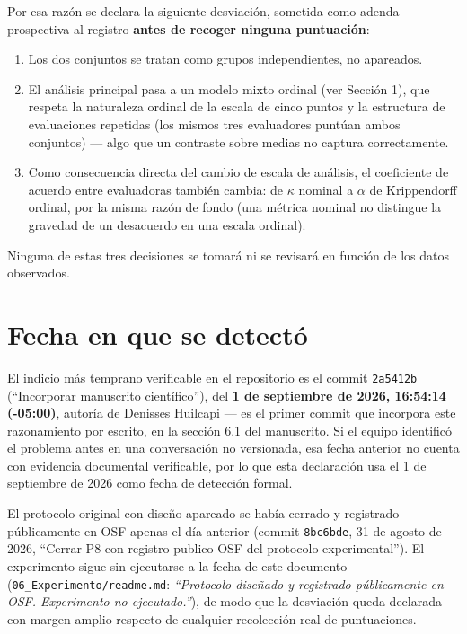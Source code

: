 \documentclass[11pt,a4paper]{article}
\newcommand{\id}[1]{\texttt{#1}}
\begin{document}
Por esa razón se declara la siguiente desviación, sometida como adenda
prospectiva al registro \textbf{antes de recoger ninguna puntuación}:

\begin{enumerate}[label=\arabic*.]
  \item Los dos conjuntos se tratan como grupos independientes, no apareados.
  \item El análisis principal pasa a un modelo mixto ordinal (ver Sección 1),
        que respeta la naturaleza ordinal de la escala de cinco puntos y la
        estructura de evaluaciones repetidas (los mismos tres evaluadores
        puntúan ambos conjuntos) --- algo que un contraste sobre medias no
        captura correctamente.
  \item Como consecuencia directa del cambio de escala de análisis, el
        coeficiente de acuerdo entre evaluadoras también cambia: de
        $\kappa$ nominal a $\alpha$ de Krippendorff ordinal, por la misma
        razón de fondo (una métrica nominal no distingue la gravedad de un
        desacuerdo en una escala ordinal).
\end{enumerate}

Ninguna de estas tres decisiones se tomará ni se revisará en función de los
datos observados.

\section{Fecha en que se detectó}

El indicio más temprano verificable en el repositorio es el commit
\id{2a5412b} (``Incorporar manuscrito científico''), del \textbf{1 de
septiembre de 2026, 16:54:14 (-05:00)}, autoría de Denisses Huilcapi --- es
el primer commit que incorpora este razonamiento por escrito, en la sección
6.1 del manuscrito. Si el equipo identificó el problema antes en una
conversación no versionada, esa fecha anterior no cuenta con evidencia
documental verificable, por lo que esta declaración usa el 1 de septiembre
de 2026 como fecha de detección formal.

El protocolo original con diseño apareado se había cerrado y registrado
públicamente en OSF apenas el día anterior (commit \id{8bc6bde}, 31 de
agosto de 2026, ``Cerrar P8 con registro publico OSF del protocolo
experimental''). El experimento sigue sin ejecutarse a la fecha de este
documento (\texttt{06\_Experimento/readme.md}: \textit{``Protocolo diseñado
y registrado públicamente en OSF. Experimento no ejecutado.''}), de modo
que la desviación queda declarada con margen amplio respecto de cualquier
recolección real de puntuaciones.
\end{document}

